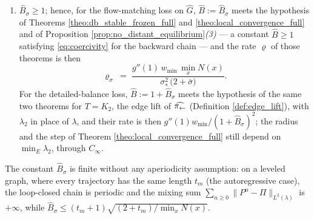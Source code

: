 \begin{proposition}
\begin{enumerate}
\begin{equation*}
        \|h-\Pi h\|_{L^2(\lambda)}\;\leq\;\widehat B_\sigma\,\|(I-P)h\|_{L^2(\lambda)},
    \end{equation*}
    \begin{equation*}
        \widehat B_\sigma:=\sigma_*\sqrt{\frac{2+\bar\sigma}{\min_{x}N(x)}}\;;
    \end{equation*}
    \item $\widehat B_\sigma\geq1$; hence, for the flow-matching loss on $\widehat G$, $\widehat B:=\widehat B_\sigma$ meets the hypothesis of Theorems \ref{theo:db_stable_frozen_full} and \ref{theo:local_convergence_full} and of Proposition \ref{prop:no_distant_equilibrium}\emph{(3)} --- a constant $\widehat B\geq1$ satisfying \eqref{eq:coercivity} for the backward chain --- and the rate $\varrho$ of those theorems is then
    \begin{equation*}
        \varrho_\sigma\;=\;\frac{g''(1)\,w_{\min}\,\min_x N(x)}{\sigma_*^2\,\bigl(2+\bar\sigma\bigr)}.
    \end{equation*}
    For the detailed-balance loss, $\widehat B:=1+\widehat B_\sigma$ meets the hypothesis of the same two theorems for $T=K_2$, the edge lift of $\widehat{\pi_{\leftarrow}}$ (Definition \ref{def:edge_lift}), with $\lambda_2$ in place of $\lambda$, and their rate is then $g''(1)w_{\min}/(1+\widehat B_\sigma)^2$; the radius and the step of Theorem \ref{theo:local_convergence_full} still depend on $\min_E\lambda_2$, through $C_\infty$.
\end{enumerate}
The constant $\widehat B_\sigma$ is finite without any aperiodicity assumption: on a leveled graph, where every trajectory has the same length $t_m$ (the autoregressive case), the loop-closed chain is periodic and the mixing sum $\sum_{n\geq0}\|P^n-\Pi\|_{L^2(\lambda)}$ is $+\infty$, while $\widehat B_\sigma\leq (t_m+1)\sqrt{(2+t_m)/\min_xN(x)}$.
\end{proposition}

